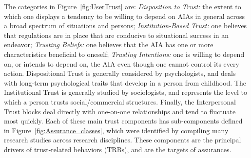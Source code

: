 The categories in Figure~\ref{fig:UserTrust} are: \textit{Disposition to Trust:} the extent to which one displays a tendency to be willing to depend on AIAs in general across a broad spectrum of situations and persons; \textit{Institution-Based Trust:} one believes that regulations are in place that are conducive to situational success in an endeavor; \textit{Trusting Beliefs:} one believes that the AIA has one or more characteristics beneficial to oneself; \textit{Trusting Intentions:} one is willing to depend on, or intends to depend on, the AIA even though one cannot control its every action. Dispositional Trust is generally considered by psychologists, and deals with long-term psychological traits that develop in a person from childhood. The Institutional Trust is generally studied by sociologists, and represents the level to which a person trusts social/commercial structures. Finally, the Interpersonal Trust blocks deal directly with one-on-one relationships and tend to fluctuate most quickly. %
%
%
Each of these main trust components has sub-components defined in Figure~\ref{fig:Assurance_classes}, which were identified by compiling many research studies across research disciplines. %
These components are the principal drivers of trust-related behaviors (TRBs), and are the targets of assurances. %

